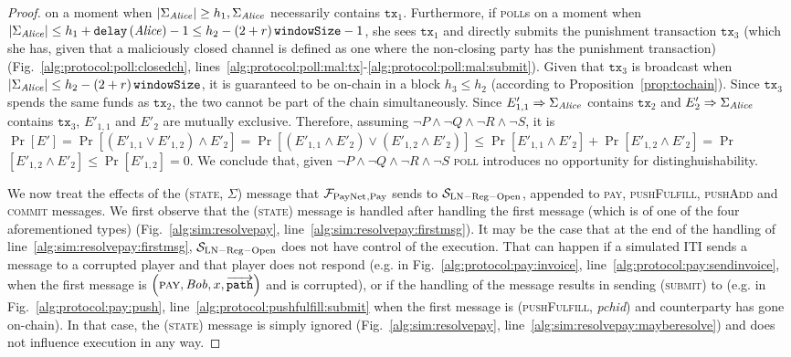 \begin{proof}
  on a moment when $|\Sigma_{\mathit{Alice}}| \geq h_1, \Sigma_{\mathit{Alice}}$ necessarily
  contains $\mathtt{tx}_1$. Furthermore, if \alice{} \textsc{poll}s on a moment
  when $|\Sigma_{\mathit{Alice}}| \leq h_1 + \mathtt{delay}\left(\mathit{Alice}\right) - 1 \leq
  h_2 - \left(2 + r\right)\texttt{windowSize}{} - 1$, she sees $\mathtt{tx}_1$ and directly submits the
  punishment transaction $\mathtt{tx}_3$ (which she has, given that a
  maliciously closed channel is defined as one where the non-closing party has
  the punishment transaction) (Fig.~\ref{alg:protocol:poll:closedch},
  lines~\ref{alg:protocol:poll:mal:tx}-\ref{alg:protocol:poll:mal:submit}).
  Given that $\mathtt{tx}_3$ is broadcast when $|\Sigma_{\mathit{Alice}}| \leq h_2 -
  \left(2 + r\right)\texttt{windowSize}{}$, it is guaranteed to be on-chain in a block $h_3 \leq h_2$
  (according to Proposition~\ref{prop:tochain}). Since $\mathtt{tx}_3$ spends
  the same funds as $\mathtt{tx}_2$, the two cannot be part of the chain
  simultaneously. Since $E'_{1,1} \Rightarrow \Sigma_{\mathit{Alice}}$ contains
  $\mathtt{tx}_2$ and $E'_2 \Rightarrow \Sigma_{\mathit{Alice}}$ contains
  $\mathtt{tx}_3$, $E'_{1,1}$ and $E'_2$ are mutually exclusive. Therefore,
  assuming $\neg P \wedge \neg Q \wedge \neg R \wedge \neg S$, it is
  $\Pr\left[E'\right] = \Pr\left[\left(E'_{1,1} \vee E'_{1,2}\right) \wedge
  E'_2\right] = \Pr\left[\left(E'_{1,1} \wedge E'_2\right) \vee \left(E'_{1,2}
  \wedge E'_2\right)\right] \leq \Pr\left[E'_{1,1} \wedge E'_2\right] +
  \Pr\left[E'_{1,2} \wedge E'_2\right] = \Pr$ $\left[ E'_{1,2} \wedge
  E'_2\right] \leq \Pr\left[E'_{1,2}\right] = 0$. We conclude that, given $\neg
  P \wedge \neg Q \wedge \neg R \wedge \neg S$ \textsc{poll} introduces no
  opportunity for distinghuishability.

  We now treat the effects of the (\textsc{state}, $\Sigma$) message that
  $\mathcal{F}_{\mathrm{PayNet}}{}_{\mathrm{, Pay}}$ sends to $\mathcal{S}_{\mathrm{LN - Reg -
  Open}}$, appended to \textsc{pay}, \textsc{pushFulfill}, \textsc{pushAdd} and
  \textsc{commit} messages. We first observe that the (\textsc{state}) message
  is handled after handling the first message (which is of one of the four
  aforementioned types) (Fig.~\ref{alg:sim:resolvepay},
  line~\ref{alg:sim:resolvepay:firstmsg}). It may be the case that at the end of
  the handling of line~\ref{alg:sim:resolvepay:firstmsg},
  $\mathcal{S}_{\mathrm{LN - Reg - Open}}$ does not have control of the
  execution. That can happen if a simulated ITI sends a message to a corrupted
  player and that player does not respond (e.g. in
  Fig.~\ref{alg:protocol:pay:invoice}, line~\ref{alg:protocol:pay:sendinvoice},
  when the first message is $\left(\textsc{pay}, \mathit{Bob}, x,
  \overrightarrow{\mathtt{path}}\right)$ and \bob{} is corrupted), or if the
  handling of the message results in sending (\textsc{submit}) to \ledger{}
  (e.g. in Fig.~\ref{alg:protocol:pay:push},
  line~\ref{alg:protocol:pushfulfill:submit} when the first message is
  (\textsc{pushFulfill}, \textit{pchid}) and counterparty has gone on-chain). In
  that case, the (\textsc{state}) message is simply ignored
  (Fig.~\ref{alg:sim:resolvepay}, line~\ref{alg:sim:resolvepay:mayberesolve})
  and does not influence execution in any way.


\end{proof}
